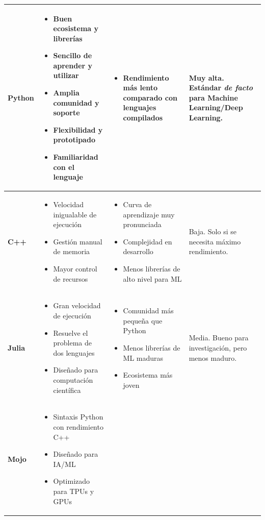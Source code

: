 \begin{xltabular}{\textwidth}{@{} >{\centering\arraybackslash}p{0.12\textwidth} >{\raggedright\arraybackslash}X >{\raggedright\arraybackslash}X >{\raggedright\arraybackslash}X @{}}
\bottomrule
\endlastfoot%
	\textbf{Python} &
	\begin{itemize}[nosep] \item Buen ecosistema y librerías \item Sencillo de aprender y utilizar \item Amplia comunidad y soporte \item Flexibilidad y prototipado \item Familiaridad con el lenguaje \end{itemize} &
	\begin{itemize}[nosep] \item Rendimiento más lento comparado con lenguajes compilados \end{itemize} &
	 Muy alta. Estándar \textit{de facto} para Machine Learning/Deep Learning. \\
	\midrule
	\textbf{C++} &
	\begin{itemize}[nosep] \item Velocidad inigualable de ejecución \item Gestión manual de memoria \item Mayor control de recursos \end{itemize} &
	\begin{itemize}[nosep] \item Curva de aprendizaje muy pronunciada \item Complejidad en desarrollo \item Menos librerías de alto nivel para ML \end{itemize} &
	Baja. Solo si se necesita máximo rendimiento. \\
	\midrule
	\textbf{Julia} &
	\begin{itemize}[nosep] \item Gran velocidad de ejecución \item Resuelve el problema de dos lenguajes \item Diseñado para computación científica \end{itemize} &
	\begin{itemize}[nosep] \item Comunidad más pequeña que Python \item Menos librerías de ML maduras \item Ecosistema más joven \end{itemize} &
	Media. Bueno para investigación, pero menos maduro. \\
	\midrule
	\textbf{Mojo} &
	\begin{itemize}[nosep] \item Sintaxis Python con rendimiento C++ \item Diseñado para IA/ML \item Optimizado para TPUs y GPUs \end{itemize} &

\end{xltabular}
